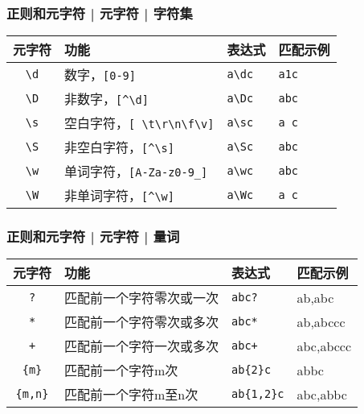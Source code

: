 \begin{frame}[fragile]
  \frametitle{正则和元字符 | 元字符 | \alert{字符集}}
  \begin{table}
    \centering
    \begin{tabularx}{\textwidth}{cXll}
      \hline
      \rowcolor{blue!50}元字符 & 功能 & 表达式 & 匹配示例\\
      \hline
      \verb|\d| & 数字，\verb|[0-9]| & \verb|a\dc| & \verb|a1c|\\
      \verb|\D| & 非数字，\verb|[|\verb|^\d|\verb|]| & \verb|a\Dc| & \verb|abc|\\
      \verb|\s| & 空白字符，\verb|[ \t|\verb|\r|\verb|\n|\verb|\f|\verb|\v|\verb|]| & \verb|a\sc| & \verb|a c|\\
      \verb|\S| & 非空白字符，\verb|[|\verb|^\s|\verb|]| & \verb|a\Sc| & \verb|abc|\\
      \verb|\w| & 单词字符，\verb|[A-Za-z0-9_]| & \verb|a\wc| & \verb|abc|\\
      \verb|\W| & 非单词字符，\verb|[|\verb|^\w|\verb|]| & \verb|a\Wc| & \verb|a c|\\
      \hline
    \end{tabularx}
  \end{table}
\end{frame}

\begin{frame}[fragile]
  \frametitle{正则和元字符 | 元字符 | \alert{量词}}
  \begin{table}
    \centering
    \begin{tabularx}{\textwidth}{cXll}
      \hline
      \rowcolor{blue!50}元字符 & 功能 & 表达式 & 匹配示例\\
      \hline
      \verb|?| & 匹配前一个字符零次或一次 & \verb|abc?| & ab,abc\\
      \verb|*| & 匹配前一个字符零次或多次 & \verb|abc*| & ab,abccc\\
      \verb|+| & 匹配前一个字符一次或多次 & \verb|abc+| & abc,abccc\\
      \verb|{m}| & 匹配前一个字符m次 & \verb|ab{2}c| & abbc\\
      \verb|{m,n}| & 匹配前一个字符m至n次 & \verb|ab{1,2}c| & abc,abbc\\
      \hline
    \end{tabularx}
  \end{table}
\end{frame}

